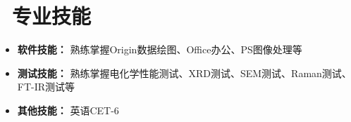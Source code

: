 \documentclass[11pt]{article}
\begin{document}
\section{\makebox[\widthof{\faCogs}][c]{\color{CVBlue}\faCogs}\ 专业技能}
\begin{itemize}[nosep]
    \item \textbf{软件技能：} 熟练掌握Origin数据绘图、Office办公、PS图像处理等
    \item \textbf{测试技能：} 熟练掌握电化学性能测试、XRD测试、SEM测试、Raman测试、FT-IR测试等
    \item \textbf{其他技能：} 英语CET-6
\end{itemize}
\end{document}
